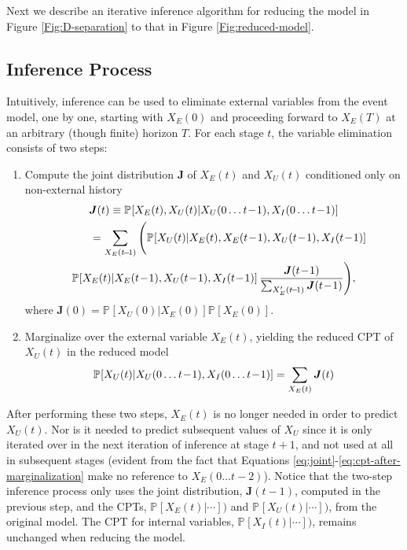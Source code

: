 \documentclass[10pt]{article}
\newcommand{\PP}[2][]{\mathbb{P\!}_{#1}\left[#2\right]}
\begin{document}
Next we describe an iterative inference algorithm for reducing the model in Figure \ref{Fig:D-separation} to that in Figure \ref{Fig:reduced-model}.

\pagebreak
\subsection{Inference Process}
\label{sec:inference-process}

Intuitively, inference can be used to eliminate external variables from the event model, one by one, starting with $X_E(0)$ and proceeding forward to $X_E(T)$ at an arbitrary (though finite) horizon $T$.  
For each stage $t$, the variable elimination consists of two steps:
\begin{enumerate}
 \item Compute the joint distribution $\boldsymbol{J}$ of $X_E(t)$ and $X_U(t)$ conditioned only on non-external history
\begin{multline}
\boldsymbol{J}(t)\equiv \PP{X_{E}(t),X_{U}(t)|X_{U}(0\ldots t\!-\!1),X_{I}(0\ldots t\!-\!1)}\\
\shoveleft
{
\quad\quad
=\sum_{X_{E}(t\!-\!1)}
\Bigg(
\PP{X_{U}(t)|X_{E}(t),X_{E}(t\!-\!1),X_{U}(t\!-\!1),X_{I}(t\!-\!1)}
}
\\
\PP{X_{E}(t)|X_{E}(t\!-\!1),X_{U}(t\!-\!1),X_{I}(t\!-\!1)}
\frac{
\boldsymbol{J}(t\!-\!1)
}{
  \sum_{X_{E}'(t\!-\!1)} \boldsymbol{J}(t\!-\!1)
}
\Bigg),
\label{eq:joint}
\end{multline}
where $\boldsymbol{J}(0) = \PP{X_{U}(0)|X_{E}(0)} \PP{X_{E}(0)}$.

\item Marginalize over the external variable $X_E(t)$, yielding the reduced CPT of $X_U(t)$ in the reduced model 
\begin{multline}
\PP{X_{U}(t)|X_{U}(0\ldots t\!-\!1),X_{I}(0\ldots t\!-\!1)} = 
\sum_{X_{E}(t)} 
\boldsymbol{J}(t)
\label{eq:cpt-after-marginalization}
\hfill
\end{multline}
\end{enumerate}
After performing these two steps, $X_E(t)$ is no longer needed in order to predict $X_U(t)$.  Nor is it needed to predict subsequent values of $X_U$ since it is only iterated over in the next iteration of inference at stage $t+1$, and not used at all in subsequent stages (evident from the fact that Equations \ref{eq:joint}-\ref{eq:cpt-after-marginalization} make no reference to $X_E(0\ldots t\!-\!2)$).  Notice that the two-step inference process only uses the joint distribution, $\boldsymbol{J}(t\!-\!1)$, computed in the previous step, and the CPTs, $\PP{X_{E}(t)|\cdots})$ and $\PP{X_{U}(t)|\cdots})$, from the original model.  The CPT for internal variables, $\PP{X_{I}(t)|\cdots})$, remains unchanged when reducing the model.
  
\end{document}
